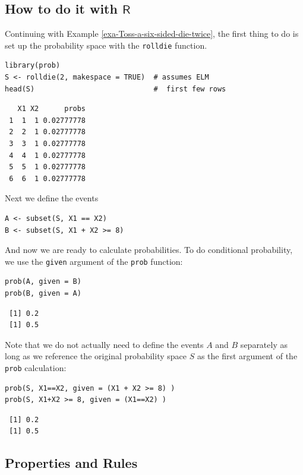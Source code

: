 \documentclass[captions=tableheading]{scrbook}
\begin{document}
\subsection{How to do it with \(\mathsf{R}\)}
\label{sec-4-6-1}


Continuing with Example \ref{exa-Toss-a-six-sided-die-twice}, the first thing to do is set up the probability space with the \texttt{rolldie} function.


\lstset{language=R}
\begin{lstlisting}
library(prob)
S <- rolldie(2, makespace = TRUE)  # assumes ELM
head(S)                            #  first few rows
\end{lstlisting}

\begin{verbatim}
   X1 X2      probs
 1  1  1 0.02777778
 2  2  1 0.02777778
 3  3  1 0.02777778
 4  4  1 0.02777778
 5  5  1 0.02777778
 6  6  1 0.02777778
\end{verbatim}

Next we define the events


\lstset{language=R}
\begin{lstlisting}
A <- subset(S, X1 == X2)
B <- subset(S, X1 + X2 >= 8)
\end{lstlisting}

And now we are ready to calculate probabilities. To do conditional probability, we use the \texttt{given} argument of the \texttt{prob} function:


\lstset{language=R}
\begin{lstlisting}
prob(A, given = B)
prob(B, given = A)
\end{lstlisting}

\begin{verbatim}
 [1] 0.2
 [1] 0.5
\end{verbatim}

Note that we do not actually need to define the events \(A\) and \(B\) separately as long as we reference the original probability space \(S\) as the first argument of the \texttt{prob} calculation:


\lstset{language=R}
\begin{lstlisting}
prob(S, X1==X2, given = (X1 + X2 >= 8) )
prob(S, X1+X2 >= 8, given = (X1==X2) )
\end{lstlisting}

\begin{verbatim}
 [1] 0.2
 [1] 0.5
\end{verbatim}
\subsection{Properties and Rules}
\label{sec-4-6-2}
\end{document}
